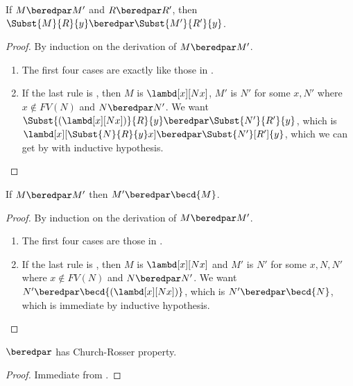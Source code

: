 \documentclass[../../../include/open-logic-section]{subfiles}
\begin{document}
\begin{lem}
  If $M \beredpar M'$ and $R \beredpar R'$, then $\Subst{M}{R}{y}
  \beredpar \Subst{M'}{R'}{y}$.
\end{lem}
\begin{proof}
  By induction on the derivation of $M \beredpar M'$.
  \begin{enumerate}
    \item The first four cases are exactly like those in
      .
    \item If the last rule is , then $M$ is
      $\lambd[x][Nx]$, $M'$ is $N'$ for some $x, N'$ where $x \notin
      FV(N)$ and $N \beredpar N'$. We want
      $\Subst{(\lambd[x][Nx])}{R}{y} \beredpar \Subst{N'}{R'}{y}$,
      which is $\lambd[x][\Subst{N}{R}{y} x] \beredpar
      \Subst{N'}[R']{y}$, which we can get by  with
      inductive hypothesis.
  \end{enumerate}
\end{proof}

\begin{lem}
  If $M \beredpar M'$ then $M' \beredpar \becd{M}$.
\end{lem}
\begin{proof}
  By induction on the derivation of $M \beredpar M'$.
  \begin{enumerate}
    \item The first four cases are those in .
    \item If the last rule is , then $M$ is
      $\lambd[x][Nx]$ and $M'$ is $N'$ for some $x,N,N'$ where $x
      \notin FV(N)$ and $N \beredpar N'$. We want $N' \beredpar
      \becd{(\lambd[x][Nx])}$, which is $N' \beredpar \becd{N}$, which
      is immediate by inductive hypothesis.
  \end{enumerate}
\end{proof}

\begin{thm}
  $\beredpar$ has Church-Rosser property.
\end{thm}
\begin{proof}
  Immediate from .
\end{proof}
\end{document}

